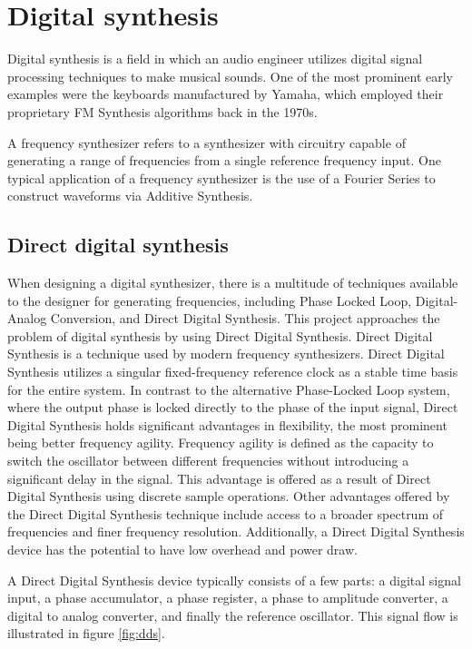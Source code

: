 \documentclass[a4paper,12pt]{report}
\begin{document}
\section{Digital synthesis}
\label{subsec:digitalsynth}
Digital synthesis is a field in which an audio engineer utilizes digital signal processing techniques to make musical sounds. One of the most prominent early examples were the keyboards manufactured by Yamaha, which employed their proprietary FM Synthesis algorithms back in the 1970s.

A frequency synthesizer refers to a synthesizer with circuitry capable of generating a range of frequencies from a single reference frequency input. One typical application of a frequency synthesizer is the use of a Fourier Series to construct waveforms via Additive Synthesis.

\subsection{Direct digital synthesis}
\label{subsec:directdigitalsynth}
When designing a digital synthesizer, there is a multitude of techniques available to the designer for generating frequencies, including Phase Locked Loop, Digital-Analog Conversion, and Direct Digital Synthesis. This project approaches the problem of digital synthesis by using Direct Digital Synthesis. Direct Digital Synthesis is a technique used by modern frequency synthesizers. Direct Digital Synthesis utilizes a singular fixed-frequency reference clock as a stable time basis for the entire system. In contrast to the alternative Phase-Locked Loop system, where the output phase is locked directly to the phase of the input signal, Direct Digital Synthesis holds significant advantages in flexibility, the most prominent being better frequency agility. Frequency agility is defined as the capacity to switch the oscillator between different frequencies without introducing a significant delay in the signal. This advantage is offered as a result of Direct Digital Synthesis using discrete sample operations. Other advantages offered by the Direct Digital Synthesis technique include access to a broader spectrum of frequencies and finer frequency resolution. Additionally, a Direct Digital Synthesis device has the potential to have low overhead and power draw.

A Direct Digital Synthesis device typically consists of a few parts: a digital signal input, a phase accumulator, a phase register, a phase to amplitude converter, a digital to analog converter, and finally the reference oscillator. This signal flow is illustrated in figure \ref{fig:dds}.
\end{document}
